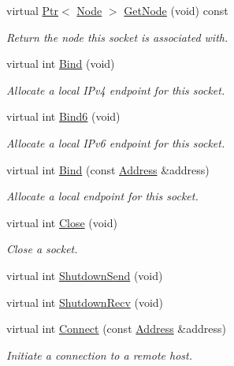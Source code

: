 \begin{DoxyCompactItemize}
virtual \hyperlink{classns3_1_1Ptr}{Ptr}$<$ \hyperlink{classns3_1_1Node}{Node} $>$ \hyperlink{classns3_1_1NscTcpSocketImpl_a5e703d0272a87ac073dc4f6520c37552}{Get\+Node} (void) const 
\begin{DoxyCompactList}\small\item\em Return the node this socket is associated with. \end{DoxyCompactList}\item 
virtual int \hyperlink{classns3_1_1NscTcpSocketImpl_add7339ac92d543a676f9b718bbc80c37}{Bind} (void)
\begin{DoxyCompactList}\small\item\em Allocate a local I\+Pv4 endpoint for this socket. \end{DoxyCompactList}\item 
virtual int \hyperlink{classns3_1_1NscTcpSocketImpl_a79a3acbd037edfb41407c4aff29b1b52}{Bind6} (void)
\begin{DoxyCompactList}\small\item\em Allocate a local I\+Pv6 endpoint for this socket. \end{DoxyCompactList}\item 
virtual int \hyperlink{classns3_1_1NscTcpSocketImpl_ae56f1a52f6303b9a00b3d8ab76746c8d}{Bind} (const \hyperlink{classns3_1_1Address}{Address} \&address)
\begin{DoxyCompactList}\small\item\em Allocate a local endpoint for this socket. \end{DoxyCompactList}\item 
virtual int \hyperlink{classns3_1_1NscTcpSocketImpl_ade3cb55d43d82f4ffed66faa960cd051}{Close} (void)
\begin{DoxyCompactList}\small\item\em Close a socket. \end{DoxyCompactList}\item 
virtual int \hyperlink{classns3_1_1NscTcpSocketImpl_a20088ea0fb9651924fcd5c5f0204edcb}{Shutdown\+Send} (void)
\item 
virtual int \hyperlink{classns3_1_1NscTcpSocketImpl_ad398b14b7410c49f1b34a0144f45f46b}{Shutdown\+Recv} (void)
\item 
virtual int \hyperlink{classns3_1_1NscTcpSocketImpl_a10d599daaff9c3b7a1e93716e850ed97}{Connect} (const \hyperlink{classns3_1_1Address}{Address} \&address)
\begin{DoxyCompactList}\small\item\em Initiate a connection to a remote host. \end{DoxyCompactList}\item 

\end{DoxyCompactItemize}
